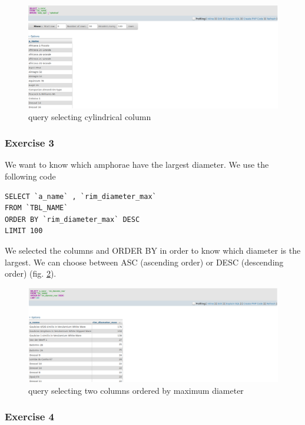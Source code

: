 \documentclass[10pt,a4paper]{article}
\begin{document}
\begin{figure}[htp]
\centering
\includegraphics[scale=0.30]{query2.png}
\caption{query selecting cylindrical column}
\label{query2}
\end{figure} 


\subsubsection{Exercise 3}

We want to know which amphorae have the largest diameter. We use the following code

\begin{verbatim}
SELECT `a_name` , `rim_diameter_max`
FROM `TBL_NAME`
ORDER BY `rim_diameter_max` DESC
LIMIT 100 
\end{verbatim}

\newpage

We selected the columns and ORDER BY in order to know which diameter is the largest. We can choose between ASC (ascending order) or DESC (descending order) (fig. \ref{query3}).

\begin{figure}[htp]
\centering
\includegraphics[scale=0.30]{query3.png}
\caption{query selecting two columns ordered by maximum diameter}
\label{query3}
\end{figure} 

\subsubsection{Exercise 4}
\end{document}
